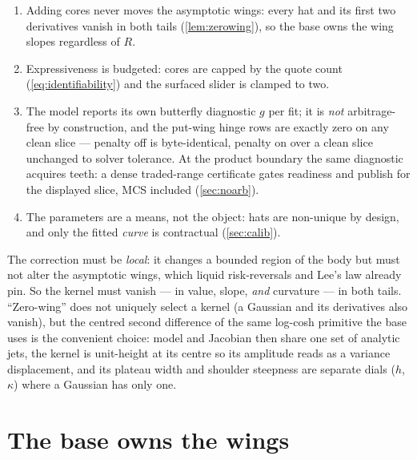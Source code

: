 \documentclass[11pt]{article}
\begin{document}
\begin{invariant}
\begin{enumerate}[leftmargin=1.6em]
\item Adding cores never moves the asymptotic wings: every hat and its first two
derivatives vanish in both tails (\cref{lem:zerowing}), so the base owns the
wing slopes regardless of $R$.
\item Expressiveness is budgeted: cores are capped by the quote count
(\cref{eq:identifiability}) and the surfaced slider is clamped to two.
\item The model reports its own butterfly diagnostic $g$ per fit; it is
\emph{not} arbitrage-free by construction, and the put-wing hinge rows are
exactly zero on any clean slice --- penalty off is byte-identical, penalty on
over a clean slice unchanged to solver tolerance.  At the product boundary
the same diagnostic acquires teeth: a dense traded-range certificate gates
readiness and publish for the displayed slice, MCS included
(\cref{sec:noarb}).
\item The parameters are a means, not the object: hats are non-unique by design,
and only the fitted \emph{curve} is contractual (\cref{sec:calib}).
\end{enumerate}
\end{invariant}

\begin{heuristic}
The correction must be \emph{local}: it changes a bounded region of the body but
must not alter the asymptotic wings, which liquid risk-reversals and Lee's law
already pin.  So the kernel must vanish --- in value, slope, \emph{and}
curvature --- in both tails.  ``Zero-wing'' does not uniquely select a kernel (a
Gaussian and its derivatives also vanish), but the centred second difference of
the same log-cosh primitive the base uses is the convenient choice: model and
Jacobian then share one set of analytic jets, the kernel is unit-height at its
centre so its amplitude reads as a variance displacement, and its plateau width
and shoulder steepness are separate dials ($h$, $\kappa$) where a Gaussian has
only one.
\end{heuristic}

\section{The base owns the wings}
\label{sec:base}
\end{document}
